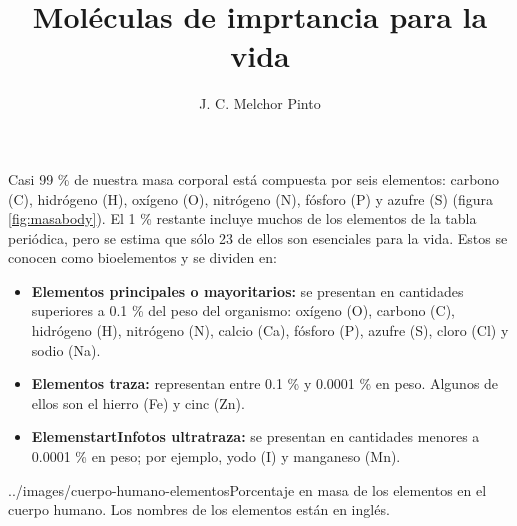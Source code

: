 \documentclass[12pt]{guia}
\title{Moléculas de imprtancia para la vida}
\author{J. C. Melchor Pinto}
\begin{document}
\pagestyle{headandfoot}
\addpoints
\INFO

\begin{startInfo}
    {
        Casi 99 \% de nuestra masa corporal está compuesta por seis elementos:
        carbono (C), hidrógeno (H), oxígeno (O), nitrógeno (N), fósforo
        (P) y azufre (S) (figura \ref{fig:masabody}). El 1  \% restante incluye muchos
        de los elementos de la tabla periódica, pero se estima que
        sólo 23 de ellos son esenciales para la vida. Estos se conocen
        como bioelementos y se dividen en:
        \begin{itemize}
            \item \textbf{Elementos principales o mayoritarios:} se presentan en cantidades superiores a 0.1 \% del peso del organismo: oxígeno (O),
                  carbono (C), hidrógeno (H), nitrógeno (N), calcio (Ca), fósforo
                  (P), azufre (S), cloro (Cl) y sodio (Na).
            \item \textbf{Elementos traza:} representan entre 0.1 \% y 0.0001 \% en peso.
                  Algunos de ellos son el hierro (Fe) y cinc (Zn).
            \item \textbf{ElemenstartInfotos ultratraza:} se presentan en cantidades menores a
                  0.0001 \% en peso; por ejemplo, yodo (I) y manganeso (Mn).
        \end{itemize}
    }{../images/cuerpo-humano-elementos}{Porcentaje en masa de los elementos
        en el cuerpo humano. Los nombres de los elementos están en inglés.}
\end{startInfo}
\end{document}

